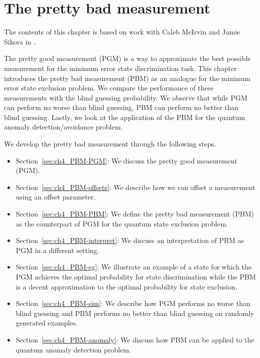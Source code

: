 \chapter{The pretty bad measurement} \label{ch:PBM}

 The contents of this chapter is based on work with Caleb McIrvin and Jamie Sikora in \cite{mcirvin2024quantum}.

 The pretty good measurement (PGM) is a way to approximate the best possible measurement for the minimum error state discrimination task.
 This chapter introduces the pretty bad measurement (PBM) as an analogue for the minimum error state exclusion problem.
 We compare the performance of these measurements with the blind guessing probability.
 We observe that while PGM can perform no worse than blind guessing, PBM can perform no better than blind guessing.
 Lastly, we look at the application of the PBM for the quantum anomaly detection/avoidance problem.

 We develop the pretty bad measurement through the following steps.
 \begin{itemize}
     \item Section~\ref{sec:ch4_PBM-PGM}: We discuss the pretty good measurement (PGM).
     \item Section~\ref{sec:ch4_PBM-offsets}: We describe how we can offset a measurement using an offset parameter.
     \item Section~\ref{sec:ch4_PBM-PBM}: We define the pretty bad measurement (PBM) as the counterpart of PGM for the quantum state exclusion problem.
     \item Section~\ref{sec:ch4_PBM-interpret}: We discuss an interpretation of PBM as PGM in a different setting.
     \item Section~\ref{sec:ch4_PBM-eg}: We illustrate an example of a state for which the PGM achieves the optimal probability for state discrimination while the PBM is a decent approximation to the optimal probability for state exclusion.
     \item Section~\ref{sec:ch4_PBM-sim}: We describe how PGM performs no worse than blind guessing and PBM performs no better than blind guessing on randomly generated examples.
     \item Section~\ref{sec:ch4_PBM-anomaly}: We discuss how PBM can be applied to the quantum anomaly detection problem.
 \end{itemize}

